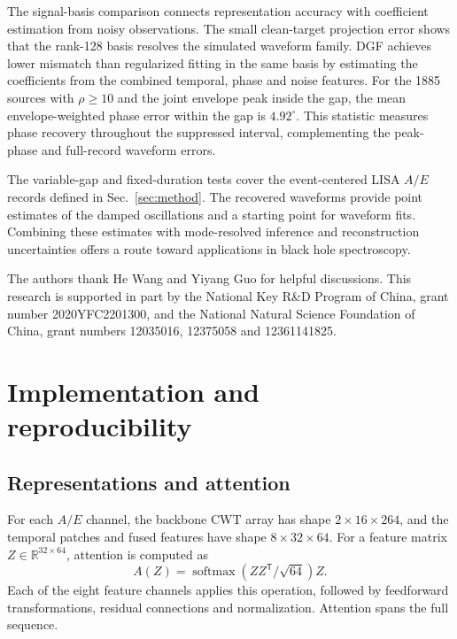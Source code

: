 \documentclass[10pt,prd,aps,a4paper,twocolumn,superscriptaddress,nofootinbib,floatfix]{revtex4-2}
\begin{document}
The signal-basis comparison connects representation accuracy with coefficient estimation from noisy observations. The small clean-target projection error shows that the rank-128 basis resolves the simulated waveform family. DGF achieves lower mismatch than regularized fitting in the same basis by estimating the coefficients from the combined temporal, phase and noise features. For the 1885 sources with $\rho\ge10$ and the joint envelope peak inside the gap, the mean envelope-weighted phase error within the gap is $4.92^\circ$. This statistic measures phase recovery throughout the suppressed interval, complementing the peak-phase and full-record waveform errors.

The variable-gap and fixed-duration tests cover the event-centered LISA $A/E$ records defined in Sec.~\ref{sec:method}. The recovered waveforms provide point estimates of the damped oscillations and a starting point for waveform fits. Combining these estimates with mode-resolved inference and reconstruction uncertainties offers a route toward applications in black hole spectroscopy.

\begin{acknowledgments}
The authors thank He Wang and Yiyang Guo for helpful discussions. This research is supported in part by the National Key R\&D Program of China, grant number 2020YFC2201300, and the National Natural Science Foundation of China, grant numbers 12035016, 12375058 and 12361141825.

\end{acknowledgments}
\onecolumngrid
\clearpage
\twocolumngrid
\appendix
\section{Implementation and reproducibility}\label{app:model_analysis}
\subsection{Representations and attention}
For each $A/E$ channel, the backbone CWT array has shape $2\times16\times264$, and the temporal patches and fused features have shape $8\times32\times64$. For a feature matrix $Z\in\mathbb R^{32\times64}$, attention is computed as
\begin{equation}
A(Z)=\operatorname{softmax}(ZZ^{\mathsf T}/\sqrt{64})Z.
\end{equation}
Each of the eight feature channels applies this operation, followed by feedforward transformations, residual connections and normalization. Attention spans the full sequence.
\end{document}
